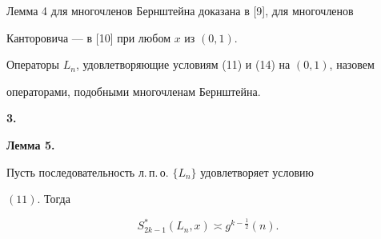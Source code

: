 


\begin{note} 


Лемма 4 для многочленов Бернштейна доказана в [9], для многочленов 


Канторовича --- в [10] при любом $x$ из $(0,1)$. 


\end{note} 


 


\begin{defnnonum} 


Операторы $L_n$, удовлетворяющие условиям (11) и (14) на $(0,1)$, назовем 


операторами, подобными многочленам Бернштейна. 


\end{defnnonum} 


 


{\bf 3.} 


{\bf Лемма 5.} {\it


Пусть последовательность л.\,п.\,о. $\{L_n\}$ удовлетворяет условию 


$(11)$. Тогда}


\begin{equation} 


S^*_{2k-1}(L_n,x)\asymp g^{k-\frac{1}{2}}(n). 


\end{equation} 


\addtocounter{lem}{1}


 


